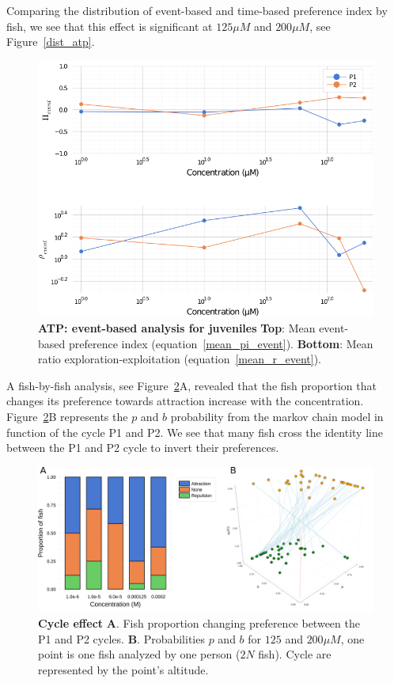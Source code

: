   Comparing the distribution of event-based and time-based preference index by fish, we see that this effect is significant at $125 \mu M$ and  $200 \mu M$, see Figure~\ref{dist_atp}.

    \begin{figure}[h!]
      \centering
      \includegraphics[width=1\textwidth]{part_2/assets/atp_event.png}
      \caption{\textbf{ATP: event-based analysis for juveniles} \textbf{Top}: Mean event-based preference index (equation~\ref{mean_pi_event}). \textbf{Bottom}: Mean ratio exploration-exploitation (equation~\ref{mean_r_event}).}
      \label{atp_event}
    \end{figure}

  A fish-by-fish analysis, see Figure~\ref{proportion}A, revealed that the fish proportion that changes its preference towards attraction increase with the concentration. Figure~\ref{proportion}B represents the $p$ and $b$ probability from the markov chain model in function of the cycle P1 and P2. We see that many fish cross the identity line between the P1 and P2 cycle to invert their preferences.

    \begin{figure}[h!]
      \centering
      \includegraphics[width=1\textwidth]{part_2/assets/proportion.png}
      \caption{\textbf{Cycle effect} \textbf{A}. Fish proportion changing preference between the P1 and P2 cycles. \textbf{B}. Probabilities $p$ and $b$ for $125$ and $200 \mu M$, one point is one fish analyzed by one person ($2N$ fish). Cycle are represented by the point's altitude.}
      \label{proportion}
    \end{figure}

